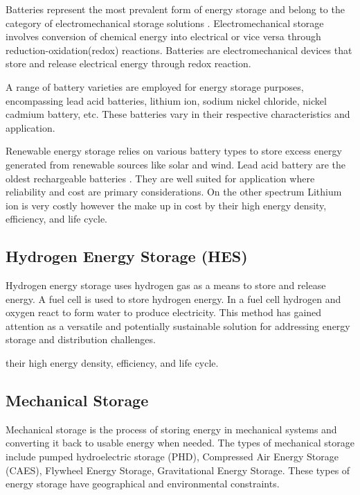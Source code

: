 \begin{sloppypar}
Batteries represent the most prevalent form of energy storage and belong to the category of electromechanical storage solutions \cite{19}. Electromechanical storage involves conversion of chemical energy into electrical or vice versa through reduction-oxidation(redox) reactions. Batteries are electromechanical devices that store and release electrical energy through redox reaction. \par
\end{sloppypar}
A range of battery varieties are employed for energy storage purposes, encompassing lead acid batteries, lithium ion, sodium nickel chloride, nickel cadmium battery, etc. These batteries vary in their respective characteristics and application. \par
Renewable energy storage relies on various battery types to store excess energy generated from renewable sources like solar and wind. Lead acid battery are the oldest rechargeable batteries \cite{20}. They are well suited for application where reliability and cost are primary considerations. On the other spectrum Lithium ion is very costly however the make up in cost by their high energy density, efficiency, and life cycle.\par
\subsection{Hydrogen Energy Storage (HES)} 
Hydrogen energy storage uses hydrogen gas as a means to store and release energy. A fuel cell is used to store hydrogen energy. In a fuel cell hydrogen and oxygen react to form water to produce electricity. This method has gained attention as a versatile and potentially sustainable solution for addressing energy storage and distribution challenges. \par
their high energy density, efficiency, and life cycle.\par
\subsection{Mechanical Storage} 
Mechanical storage is the process of storing energy in mechanical systems and converting it back to usable energy when needed. The types of mechanical storage include pumped hydroelectric storage (PHD), Compressed Air Energy Storage (CAES), Flywheel Energy Storage, Gravitational Energy Storage. These types of energy storage have geographical and environmental constraints.\par
